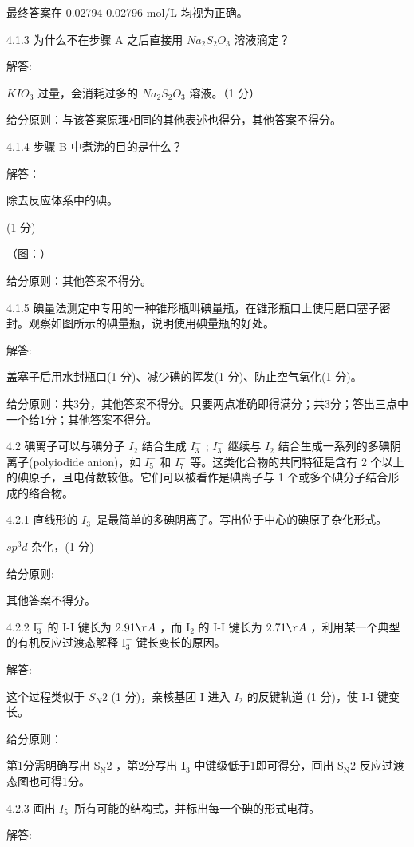 最终答案在 0.02794-0.02796 mol/L 均视为正确。

4.1.3 为什么不在步骤 A 之后直接用 $Na_{2}S_{2}O_{3}$ 溶液滴定？

解答:

$KIO_{3}$ 过量，会消耗过多的 $Na_{2}S_{2}O_{3}$ 溶液。（1 分）

给分原则：与该答案原理相同的其他表述也得分，其他答案不得分。

4.1.4 步骤 B 中煮沸的目的是什么？

解答：

除去反应体系中的碘。

(1 分)

（图：）

给分原则：其他答案不得分。

4.1.5 碘量法测定中专用的一种锥形瓶叫碘量瓶，在锥形瓶口上使用磨口塞子密封。观察如图所示的碘量瓶，说明使用碘量瓶的好处。

解答:

盖塞子后用水封瓶口(1 分)、减少碘的挥发(1 分)、防止空气氧化(1 分)。

给分原则：共3分，其他答案不得分。只要两点准确即得满分；共3分；答出三点中一个给1分；其他答案不得分。

4.2 碘离子可以与碘分子 $I_{2}$ 结合生成 $I_{3}^{-}$ ; $I_{3}^{-}$ 继续与 $I_{2}$ 结合生成一系列的多碘阴离子(polyiodide anion)，如 $I_{5}^{-}$ 和 $I_{7}^{-}$ 等。这类化合物的共同特征是含有 2 个以上的碘原子，且电荷数较低。它们可以被看作是碘离子与 1 个或多个碘分子结合形成的络合物。

4.2.1 直线形的 $I_{3}^{-}$ 是最简单的多碘阴离子。写出位于中心的碘原子杂化形式。

$sp^{3}d$ 杂化，(1 分)

给分原则:

其他答案不得分。

4.2.2 $\mathrm{I}_3^-$ 的 I-I 键长为 $2.91\AA$ ，而 $\mathrm{I}_2$ 的 I-I 键长为 $2.71\AA$ ，利用某一个典型的有机反应过渡态解释 $\mathrm{I}_3^-$ 键长变长的原因。

解答:

这个过程类似于 $S_{N}2$ (1 分)，亲核基团 I 进入 $I_{2}$ 的反键轨道 (1 分)，使 I-I 键变长。

给分原则：

第1分需明确写出 $\mathrm{S_N2}$ ，第2分写出 $\mathbf{I}_3$ 中键级低于1即可得分，画出 $\mathrm{S_N2}$ 反应过渡态图也可得1分。

4.2.3 画出 $I_{5}^{-}$ 所有可能的结构式，并标出每一个碘的形式电荷。

解答:

